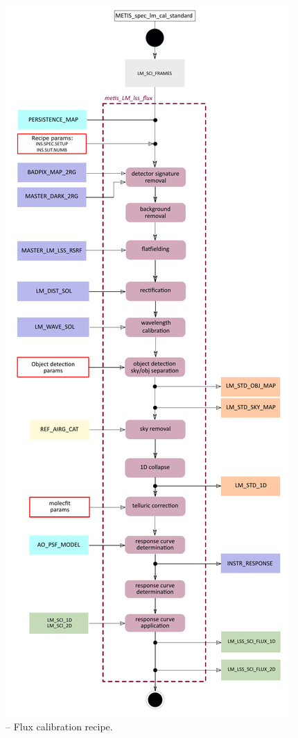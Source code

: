\begin{figure}[ht]
  \centering
  \includegraphics[width=0.4\textheight]{figures/metis_lm_lss_flux_v0.64.pdf}
  \caption[Recipe: ]{ --
    Flux calibration recipe.}
  \label{Fig:rec_lm_lss_flux}
\end{figure}
